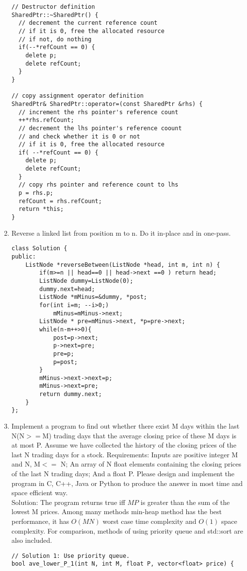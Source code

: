 \documentclass[10pt, onecolumn, draftcls]{IEEEtran}
\begin{document}
\begin{enumerate}
\begin{lstlisting}
// Destructor definition
SharedPtr::~SharedPtr() {
  // decrement the current reference count
  // if it is 0, free the allocated resource
  // if not, do nothing
  if(--*refCount == 0) {
    delete p;
    delete refCount;
  }
}

// copy assignment operator definition
SharedPtr& SharedPtr::operator=(const SharedPtr &rhs) {
  // increment the rhs pointer's reference count
  ++*rhs.refCount;
  // decrement the lhs pointer's reference coount
  // and check whether it is 0 or not
  // if it is 0, free the allocated resource
  if( --*refCount == 0) {
    delete p;
    delete refCount;
  }
  // copy rhs pointer and reference count to lhs
  p = rhs.p;
  refCount = rhs.refCount;
  return *this;
}
\end{lstlisting}
\item
Reverse a linked list from position m to n. Do it in-place and in one-pass.
\begin{lstlisting}
class Solution {
public:
	ListNode *reverseBetween(ListNode *head, int m, int n) {
		if(m>=n || head==0 || head->next ==0 ) return head;
		ListNode dummy=ListNode(0);
		dummy.next=head;
		ListNode *mMinus=&dummy, *post;
		for(int i=m; --i>0;) 
			mMinus=mMinus->next;
		ListNode * pre=mMinus->next, *p=pre->next;
		while(n-m++>0){
			post=p->next;
			p->next=pre;
			pre=p;
			p=post;
		}
		mMinus->next->next=p;
		mMinus->next=pre;
		return dummy.next;
	}
};
\end{lstlisting}
\item
Implement a program to find out whether there exist M days within the last N(N$>=$M) trading days that the average closing price of these M days is at most P. Assume we have collected the history of the closing prices of the last N trading days for a stock. Requirements: Inputs are positive integer M and N, M$<=$ N; An array of N float elements containing the
closing prices of the last N trading days; And a float P. Please design and implement the program in C, C++, Java or Python to produce the answer in most time and space efficient way.\\
{\color{red} Solution}: The program returns true iff $MP$ is greater than the sum of the lowest M prices.  Among many methods min-heap method has the best performance, it has $O(MN)$ worst case time complexity and $O(1)$ space complexity. For comparison, methods of using priority queue and std::sort are also included.
\begin{lstlisting}
// Solution 1: Use priority queue.
bool ave_lower_P_1(int N, int M, float P, vector<float> price) {


\end{lstlisting}
\end{enumerate}
\end{document}
